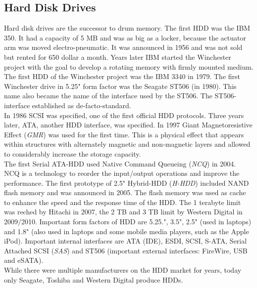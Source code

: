 \documentclass{acm_proc_article-sp}
\begin{document}
\subsection{Hard Disk Drives}
Hard disk drives are the successor to drum memory. The first HDD was the IBM 350. It had a capacity of 5 MB and was as big as a locker, because the actuator arm was moved electro-pneumatic. It was announced in 1956 and was not sold but rented for 650 dollar a month. Years later IBM started the Winchester project with the goal to develop a rotating memory with firmly mounted medium. The first HDD of the Winchester project was the IBM 3340 in 1979. The first Winchester drive in 5.25" form factor was the Seagate ST506 (in 1980). This name also became the name of the interface used by the ST506. The ST506-interface established as de-facto-standard.
\\
In 1986 SCSI was specified, one of the first official HDD protocols. Three years later, ATA, another HDD interface, was specified. In 1997 Giant Magnetoresistive Effect (\emph{GMR}) was used for the first time. This is a physical effect that appears within structures with alternately magnetic and non-magnetic layers and allowed to considerably increase the storage capacity.
\\
The first Serial ATA-HDD used Native Command Queueing (\emph{NCQ}) in 2004. NCQ is a technology to reorder the input/output operations and improve the performance. The first prototype of 2.5" Hybrid-HDD (\emph{H-HDD}) included NAND flash memory and was announced in 2005. The flash memory was used as cache to enhance the speed and the response time of the HDD. The 1 terabyte limit was reched by Hitachi in 2007, the 2 TB and 3 TB limit by Western Digital in 2009/2010. Important form factors of HDD are 5.25.", 3.5", 2.5" (used in laptops) and 1.8" (also used in laptops and some mobile media players, such as the Apple iPod). Important internal interfaces are ATA (IDE), ESDI, SCSI, S-ATA, Serial Attached SCSI (\emph{SAS}) and ST506 (important external interfaces: FireWire, USB and eSATA).
\\
While  there were multiple manufacturers on the HDD market for years, today only Seagate, Toshiba and Western Digital produce HDDs.
\end{document}
